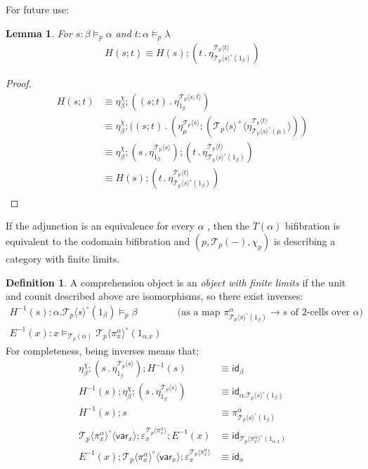\documentclass[10pt]{article}
\newtheorem{lemma}{Lemma}
\theoremstyle{definition}
\newtheorem{definition}{Definition}
\newcommand\TrCirc[2]{\ensuremath{{#1}^\circ(#2)}}
\newcommand\var[1]{\ensuremath{\mathsf{var}_{#1}}}
\newcommand{\id}{\mathsf{id}}
\newcommand\El[2]{\mathcal{T}_{#1}(#2)}
\newcommand\ApEl[2]{\mathcal{T}_{#1}\langle#2\rangle}
\newcommand\ap[2]{\ensuremath{#1 \langle #2 \rangle }}
\newcommand\bdot[0]{\mathbin{.}}
\begin{document}
For future use:

\begin{lemma}
For $s : \beta \vDash_p \alpha$ and $t : \alpha \vDash_p \lambda$
\begin{align*}
H(s;t) \equiv H(s) ; (t \bdot \eta^{\ApEl{p}{t}}_{\TrCirc{\ApEl{p}{s}}{1_\beta}})
\end{align*}
\end{lemma}
\begin{proof}
\begin{align*}
H(s;t)
&\equiv \eta^\chi_\beta ; ((s;t) \bdot \eta^{\ApEl{p}{s;t}}_{1_\beta}) \\
&\equiv \eta^\chi_\beta ; ((s;t) \bdot (\eta^{\ApEl{p}{s}}_\mu ; (\ap{\ApEl{p}{s}^+}{\eta^{\ApEl{p}{t}}_{\TrCirc{\ApEl{p}{s}}{\mu}}})) \\
&\equiv \eta^\chi_\beta ; (s \bdot \eta^{\ApEl{p}{s}}_{1_\beta}) ; (t \bdot \eta^{\ApEl{p}{t}}_{\TrCirc{\ApEl{p}{s}}{1_\beta}}) \\
&\equiv H(s) ; (t \bdot \eta^{\ApEl{p}{t}}_{\TrCirc{\ApEl{p}{s}}{1_\beta}}) \\
\end{align*}
\end{proof}

If the adjunction is an equivalence for every $\alpha$ , then the $T(\alpha)$ bifibration is equivalent to the codomain bifibration and $(p,\El{p}{-},\chi_p)$ is describing a category with finite limits. 

\begin{definition}
  A comprehension object is an \emph{object with finite limits} if the unit and counit described above are isomorphisms, so there exist inverses:
  \begin{align*}
  H^{-1}(s) : \alpha.\TrCirc{\ApEl{p}{s}}{1_\beta} \vDash_p \beta && \text{(as a map $\pi^\alpha_{\TrCirc{\ApEl{p}{s}}{1_\beta}} \to s$ of 2-cells over $\alpha$)} \\
  E^{-1}(x) : x \vDash_{\El{p}{\alpha}} \TrCirc{\ApEl{p}{\pi^\alpha_x}}{1_{\alpha.x}}
  \end{align*}
  For completeness, being inverses means that:
  \begin{align*}
  \eta^\chi_\beta ; (s \bdot \eta^{\ApEl{p}{s}}_{1_\beta}) ; H^{-1}(s) &\equiv \id_\beta \\
   H^{-1}(s) ; \eta^\chi_\beta ; (s \bdot \eta^{\ApEl{p}{s}}_{1_\beta}) &\equiv \id_{\alpha.\TrCirc{\ApEl{p}{s}}{1_\beta}} \\
   H^{-1}(s) ; s &\equiv \pi^\alpha_{\TrCirc{\ApEl{p}{s}}{1_\beta}} \\
   \ap{\ApEl{p}{\pi^\alpha_x}^\circ}{\var{x}} ; \varepsilon^{\ApEl{p}{\pi^\alpha_x}}_x ; E^{-1}(x) &\equiv \id_{\TrCirc{\ApEl{p}{\pi^\alpha_x}}{1_{\alpha.x}}} \\
   E^{-1}(x) ; \ap{\ApEl{p}{\pi^\alpha_x}^\circ}{\var{x}} ; \varepsilon^{\ApEl{p}{\pi^\alpha_x}}_x &\equiv \id_x  
  \end{align*}
\end{definition}
\end{document}
